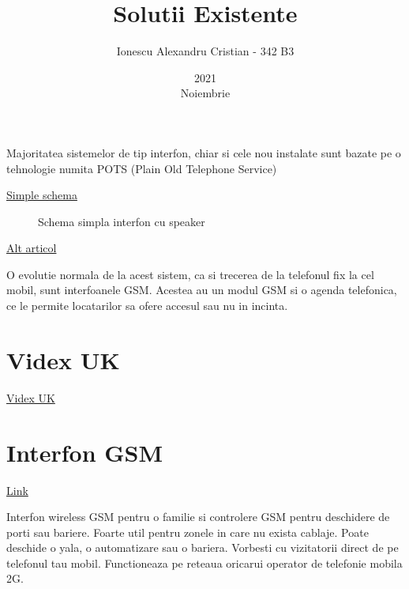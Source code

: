 \documentclass[12pt,english]{article}
\title{Solutii Existente}
\date{2021\\ Noiembrie}
\author{Ionescu Alexandru Cristian - 342 B3}
\begin{document}
\maketitle
\newpage

\tableofcontents
\newpage

Majoritatea sistemelor de tip interfon, chiar si cele nou instalate sunt bazate pe o tehnologie numita POTS (Plain Old Telephone Service)

\href{https://www.epanorama.net/documents/telecom/telephone_intercom.html}{Simple schema}

\begin{figure}[h]
  \centering
  \caption{Schema simpla interfon cu speaker}
\end{figure}

\href{https://www.nextiva.com/blog/what-is-pots.html}{Alt articol}

O evolutie normala de la acest sistem, ca si trecerea de la telefonul fix la cel mobil, sunt interfoanele GSM. Acestea au un modul GSM si o agenda telefonica, ce le permite locatarilor sa ofere accesul sau nu in incinta.

\section {Videx UK}

\href{https://www.videxuk.com/system/gsm-intercoms/}{Videx UK}

\section {Interfon GSM}

\href{https://www.a2t.ro/interfoane-videointerfoane/interfon-wireless-gsm-pentru-o-familie.html}{Link}

Interfon wireless GSM pentru o familie si controlere GSM pentru deschidere de porti sau bariere. Foarte util pentru zonele in care nu exista cablaje. Poate deschide o yala, o automatizare sau o bariera. Vorbesti cu vizitatorii direct de pe telefonul tau mobil. Functioneaza pe reteaua oricarui operator de telefonie mobila 2G.
\end{document}

